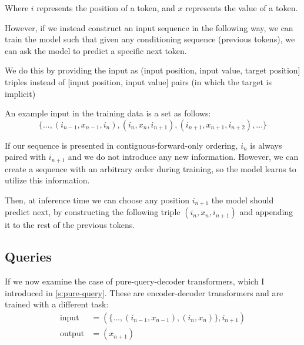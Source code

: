 Where $i$ represents the position of a token, and $x$ represents the value of a token.

However, if we instead construct an input sequence in the following way, we can train the model such that given any conditioning sequence (previous tokens), we can ask the model to predict a specific next token.

We do this by providing the input as (input position, input value, target position] triples instead of [input position, input value] pairs (in which the target is implicit)



An example input in the training data is a set as follows:
$$
   \{ ..., (i_{n-1}, x_{n-1}, i_{n}), (i_{n}, x_{n}, i_{n+1}), (i_{n+1}, x_{n+1}, i_{n+2}), ... \}
$$


If our sequence is presented in contiguous-forward-only ordering, $i_n$ is always paired with $i_{n+1}$ and we do not introduce any new information. However, we can create a sequence with an arbitrary order during training, so the model learns to utilize this information.

Then, at inference time we can choose any position $i_{n+1}$ the model should predict next, by constructing the following triple $(i_n, x_n, i_{n+1})$ and appending it to the rest of the previous tokens.

\subsection{Queries}
\label{ss:cross-attn-queries}


If we now examine the case of pure-query-decoder transformers, which I introduced in \cref{s:pure-query}. These are encoder-decoder transformers and are trained with a different task:
\begin{align*}
    \text{input} &= (\{ ..., (i_{n-1}, x_{n-1}), (i_{n}, x_{n}) \}, i_{n+1}) \\
    \text{output} &= (x_{n+1})
\end{align*}

